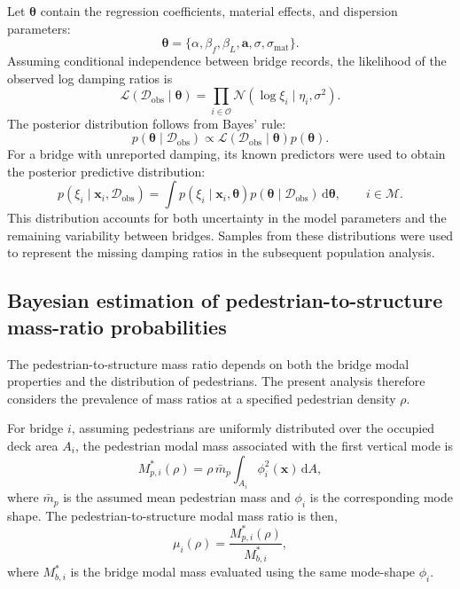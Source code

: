 \documentclass[preprint,a4paper,12pt]{elsarticle}
\begin{document}
Let $\boldsymbol{\theta}$ contain the regression coefficients, material effects, and dispersion parameters:
\begin{equation}
    \boldsymbol{\theta}
    = \{\alpha,\beta_f,\beta_L,\mathbf{a},
       \sigma,\sigma_{\mathrm{mat}}\}.
\end{equation}
Assuming conditional independence between bridge records, the likelihood of the observed log damping ratios is
\begin{equation}
    \mathcal{L}(\mathcal{D}_{\mathrm{obs}}\mid\boldsymbol{\theta})
    =
    \prod_{i\in\mathcal{O}}
    \mathcal{N}\!\left(
        \log\xi_i\mid\eta_i,\sigma^2
    \right).
\end{equation}
The posterior distribution follows from Bayes' rule:
\begin{equation}
    p(\boldsymbol{\theta}\mid\mathcal{D}_{\mathrm{obs}})
    \propto
    \mathcal{L}(\mathcal{D}_{\mathrm{obs}}\mid\boldsymbol{\theta})
    p(\boldsymbol{\theta}).
\end{equation}
For a bridge with unreported damping, its known predictors were used to obtain the posterior predictive distribution:
\begin{equation}
    p(\xi_i\mid\mathbf{x}_i,\mathcal{D}_{\mathrm{obs}})
    =
    \int
    p(\xi_i\mid\mathbf{x}_i,\boldsymbol{\theta})
    p(\boldsymbol{\theta}\mid\mathcal{D}_{\mathrm{obs}})
    \,\mathrm{d}\boldsymbol{\theta},
    \qquad i\in\mathcal{M}.
\end{equation}
This distribution accounts for both uncertainty in the model parameters and the remaining variability between bridges. 
Samples from these distributions were used to represent the missing damping ratios in the subsequent population analysis.

\subsection{Bayesian estimation of pedestrian-to-structure
mass-ratio probabilities}\label{sec:mass_ratio_model}

The pedestrian-to-structure mass ratio depends on both the bridge modal properties and the distribution of pedestrians.
The present analysis therefore considers the prevalence of mass ratios at a specified pedestrian density $\rho$.

For bridge $i$, assuming pedestrians are uniformly distributed over the occupied deck area $A_i$, the pedestrian modal mass associated with the first vertical mode is
\begin{equation}
    M_{p,i}^{*}(\rho)
    =
    \rho\,\bar m_p
    \int_{A_i}\phi_i^2(\mathbf{x})\,\mathrm{d}A,
\end{equation}
where $\bar m_p$ is the assumed mean pedestrian mass and $\phi_i$ is the corresponding mode shape. 
The pedestrian-to-structure modal mass ratio is then,
\begin{equation}
    \mu_i(\rho)
    =
    \frac{M_{p,i}^{*}(\rho)}{M_{b,i}^{*}},
\end{equation}
where $M_{b,i}^{*}$ is the bridge modal mass evaluated using the same mode-shape $\phi_i$.
\end{document}

